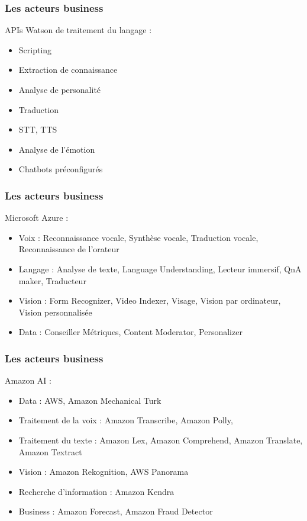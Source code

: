 \begin{frame}
  \frametitle{Les acteurs business}
  APIs Watson de traitement du langage : \\
  \begin{minipage}[c]{0.49\linewidth}
    \begin{itemize}
    \item Scripting
    \item Extraction de connaissance
    \item Analyse de personalité
    \item Traduction
    \end{itemize}
  \end{minipage}\hfill
  \begin{minipage}[c]{0.50\linewidth}
    \begin{itemize}
    \item STT, TTS
    \item Analyse de l'émotion
    \item Chatbots préconfigurés
    \end{itemize}
  \end{minipage}\hfill
\end{frame}

\begin{frame}
  \frametitle{Les acteurs business}
  Microsoft Azure : 
  \begin{itemize}
    \item Voix : Reconnaissance vocale, Synthèse vocale, Traduction vocale, Reconnaissance de l'orateur
    \item Langage : Analyse de texte, Language Understanding, Lecteur immersif, QnA maker, Traducteur
    \item Vision : Form Recognizer, Video Indexer, Visage, Vision par ordinateur, Vision personnalisée
    \item Data : Conseiller Métriques, Content Moderator, Personalizer
  \end{itemize}
\end{frame}

\begin{frame}
  \frametitle{Les acteurs business}
  Amazon AI :
  \begin{itemize}
    \item Data : AWS, Amazon Mechanical Turk
    \item Traitement de la voix : Amazon Transcribe, Amazon Polly, 
    \item Traitement du texte : Amazon Lex, Amazon Comprehend, Amazon Translate, Amazon Textract
    \item Vision : Amazon Rekognition, AWS Panorama
    \item Recherche d'information : Amazon Kendra
    \item Business : Amazon Forecast, Amazon Fraud Detector
  \end{itemize}
\end{frame}

